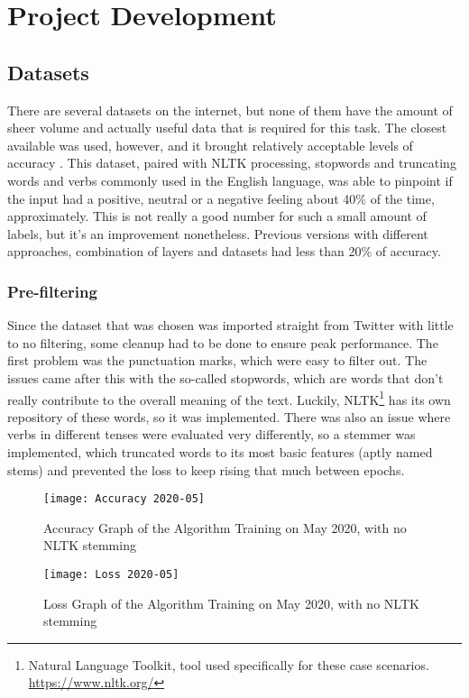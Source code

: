 \chapter{Project Development}

\section{Datasets}
There are several datasets on the internet, but none of them have the amount of sheer volume and actually useful data that is required for this task. The closest available was used, however, and it brought relatively acceptable levels of accuracy \citep{rf7}.
This dataset, paired with NLTK processing, stopwords and truncating words and verbs commonly used in the English language, was able to pinpoint if the input had a positive, neutral or a negative feeling about 40\% of the time, approximately.
This is not really a good number for such a small amount of labels, but it's an improvement nonetheless. Previous versions with different approaches, combination of layers and datasets had less than 20\% of accuracy.
\pagebreak

\subsection{Pre-filtering}
Since the dataset that was chosen was imported straight from Twitter with little to no filtering, some cleanup had to be done to ensure peak performance.
The first problem was the punctuation marks, which were easy to filter out. The issues came after this with the so-called stopwords, which are words that don't really contribute to the overall meaning of the text. Luckily, NLTK\footnote{Natural Language Toolkit, tool used specifically for these case scenarios. \url{https://www.nltk.org/}} has its own repository of these words, so it was implemented. There was also an issue where verbs in different tenses were evaluated very differently, so a  stemmer was implemented, which truncated words to its most basic features (aptly named stems) and prevented the loss to keep rising that much between epochs.
\pagebreak
\begin{figure}[!h]
	\centering
	\texttt{[image: Accuracy 2020-05]}
	\caption{Accuracy Graph of the Algorithm Training on May 2020, with no NLTK stemming}
	\label{fig:accuracy2020_nofilter}
	\texttt{[image: Loss 2020-05]}
	\caption{Loss Graph of the Algorithm Training on May 2020, with no NLTK stemming}
	\label{fig:loss2020_nofilter}
\end{figure}

